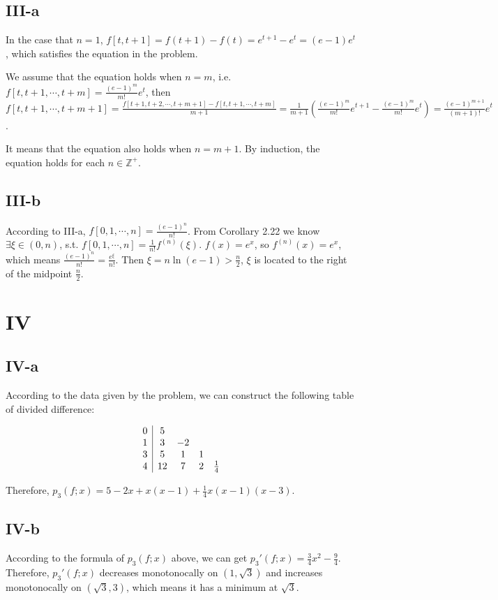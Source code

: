 \documentclass[a4paper]{article}
\begin{document}
\subsection*{III-a}
In the case that $n = 1$, $f[t,t+1] = f(t+1) - f(t) = e^{t+1} - e^t = (e-1)e^t$, which satisfies the equation in the problem.

We assume that the equation holds when $n=m$, i.e. $f[t,t+1,\cdots,t+m] = \frac{(e-1)^m}{m!}e^t$, then 
$f[t,t+1,\cdots,t+m+1] = \frac{f[t+1,t+2,\cdots,t+m+1] - f[t,t+1,\cdots,t+m]}{m+1} = \frac{1}{m+1} (\frac{(e-1)^m}{m!}e^{t+1} - \frac{(e-1)^m}{m!}e^{t}) = \frac{(e-1)^{m+1}}{(m+1)!}e^{t}$.

It means that the equation also holds when $n=m+1$. By induction, the equation holds for each $n\in \mathbb{Z}^+$.

\subsection*{III-b}
According to III-a, $f[0,1,\cdots,n] = \frac{(e-1)^n}{n!}$. From Corollary 2.22 we know $\exists \xi \in (0,n)$, s.t. $f[0,1,\cdots,n] = \frac{1}{n!}f^{(n)}(\xi)$. 
$f(x) = e^x$, so $f^{(n)}(x) = e^x$, which means $\frac{(e-1)^n}{n!} = \frac{e^{\xi}}{n!}$. Then $\xi = n \ln(e-1) > \frac{n}{2}$, $\xi$ is located to the right of the midpoint $\frac{n}{2}$.


\section*{IV}
\subsection*{IV-a}
According to the data given by the problem, we can construct the following table of divided difference:

$$
\begin{array}{c|c c c c}
  0 & 5 \\
  1 & 3 & -2 \\
  3 & 5 & 1 & 1 \\
  4 & 12 & 7 & 2 & \frac{1}{4}
\end{array}
$$

Therefore, $p_3(f;x) = 5 - 2x + x(x-1) + \frac{1}{4}x(x-1)(x-3)$.

\subsection*{IV-b}
According to the formula of $p_3(f;x)$ above, we can get $p_{3}'(f;x) = \frac{3}{4}x^2 - \frac{9}{4}$. Therefore, $p_3'(f;x)$ decreases monotonocally on $(1,\sqrt{3})$ and increases monotonocally on $(\sqrt{3},3)$, 
which means it has a minimum at $\sqrt{3}$.
\end{document}
